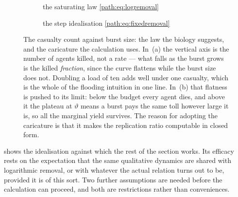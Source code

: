 \begin{figure}[htbp]
\centering
\begin{subfigure}{0.48\textwidth}
\centering
{}
\caption{the saturating law \cref{path:eq:logremoval}}
\label{path:fig:logremoval}
\end{subfigure}
\hfill
\begin{subfigure}{0.48\textwidth}
\centering
{}
\caption{the step idealisation \cref{path:eq:fixedremoval}}
\label{path:fig:capped}
\end{subfigure}
\caption{The casualty count against burst size: the law the biology
suggests, and the caricature the calculation uses. In~(a) the vertical axis
is the number of agents killed, not a rate --- what falls as the burst grows
is the killed \emph{fraction}, since the curve flattens while the burst size
does not. Doubling a load of ten adds well under one casualty, which is the
whole of the flooding intuition in one line. In~(b) that flatness is pushed
to its limit: below the budget every agent dies, and above it the plateau at
$\vartheta$ means a burst pays the same toll however large it is, so all the
marginal yield survives. The reason for adopting the caricature is that it
makes the replication ratio computable in closed form.}
\label{path:fig:removal}
\end{figure}

 shows the idealisation against which the rest of the
section works. Its efficacy rests on the expectation that the same
qualitative dynamics are shared with logarithmic removal, or with whatever
the actual relation turns out to be, provided it is of this sort. Two
further assumptions are needed before the calculation can proceed, and both
are restrictions rather than conveniences.

